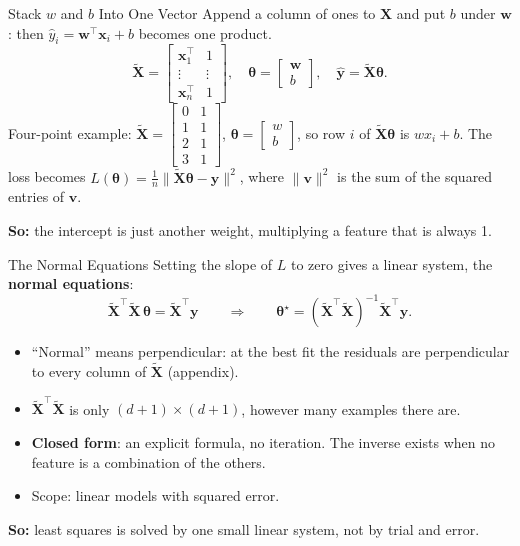 \documentclass{ntuabeamer}
\newcommand{\takeaway}[1]{\par\vspace{0.3cm}\begingroup\raggedright\noindent
  {\color{courseblue}\textbf{So:}} #1\par\endgroup}
\begin{document}
\begin{frame}{Stack $w$ and $b$ Into One Vector}
  Append a column of ones to $\mathbf X$ and put $b$ under $\mathbf w$: then $\hat y_i=\mathbf w^\top\mathbf x_i+b$ becomes one product.
  \[
    \widetilde{\mathbf X}=\begin{bmatrix}\mathbf x_1^\top&1\\[-1mm]\vdots&\vdots\\\mathbf x_n^\top&1\end{bmatrix},
    \quad
    \boldsymbol\theta=\begin{bmatrix}\mathbf w\\b\end{bmatrix},
    \quad
    \hat{\mathbf y}=\widetilde{\mathbf X}\boldsymbol\theta .
  \]
  Four-point example: $\widetilde{\mathbf X}=\begin{bmatrix}0&1\\1&1\\2&1\\3&1\end{bmatrix}$,
  $\boldsymbol\theta=\begin{bmatrix}w\\b\end{bmatrix}$, so row $i$ of $\widetilde{\mathbf X}\boldsymbol\theta$ is $w x_i+b$.
  The loss becomes
  $L(\boldsymbol\theta)=\frac1n\|\widetilde{\mathbf X}\boldsymbol\theta-\mathbf y\|^2$,
  where $\|\mathbf v\|^2$ is the sum of the squared entries of $\mathbf v$.
  \takeaway{the intercept is just another weight, multiplying a feature that is always 1.}
\end{frame}

\begin{frame}{The Normal Equations}
  Setting the slope of $L$ to zero gives a linear system, the \textbf{normal equations}:
  \[
    \widetilde{\mathbf X}^\top\widetilde{\mathbf X}\,\boldsymbol\theta
    =\widetilde{\mathbf X}^\top\mathbf y
    \qquad\Longrightarrow\qquad
    \boldsymbol\theta^\star=(\widetilde{\mathbf X}^\top\widetilde{\mathbf X})^{-1}\widetilde{\mathbf X}^\top\mathbf y .
  \]
  \begin{itemize}
    \item ``Normal'' means perpendicular: at the best fit the residuals are perpendicular to every column of $\widetilde{\mathbf X}$ (appendix).
    \item $\widetilde{\mathbf X}^\top\widetilde{\mathbf X}$ is only $(d{+}1)\times(d{+}1)$, however many examples there are.
    \item \textbf{Closed form}: an explicit formula, no iteration. The inverse exists when no feature is a combination of the others.
    \item Scope: linear models with squared error.
  \end{itemize}
  \takeaway{least squares is solved by one small linear system, not by trial and error.}
\end{frame}
\end{document}

